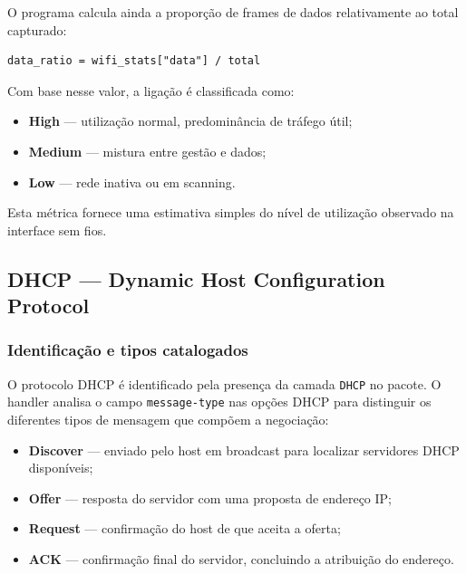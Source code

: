 \documentclass[a4paper,12pt]{article}
\begin{document}
O programa calcula ainda a proporção de frames de dados relativamente ao total capturado:

\vspace{0.5em}

\begin{lstlisting}[style=python]
data_ratio = wifi_stats["data"] / total
\end{lstlisting}

Com base nesse valor, a ligação é classificada como:

\begin{itemize}
    \item \textbf{High} — utilização normal, predominância de tráfego útil;
    \item \textbf{Medium} — mistura entre gestão e dados;
    \item \textbf{Low} — rede inativa ou em scanning.
\end{itemize}

Esta métrica fornece uma estimativa simples do nível de utilização observado na interface sem fios.



\subsection{DHCP — Dynamic Host Configuration Protocol}

\subsubsection{Identificação e tipos catalogados}

O protocolo DHCP é identificado pela presença da camada \texttt{DHCP} no pacote. O handler
analisa o campo \texttt{message-type} nas opções DHCP para distinguir os diferentes tipos
de mensagem que compõem a negociação:

\begin{itemize}
    \item \textbf{Discover} — enviado pelo host em broadcast para localizar servidores DHCP disponíveis;
    \item \textbf{Offer} — resposta do servidor com uma proposta de endereço IP;
    \item \textbf{Request} — confirmação do host de que aceita a oferta;
    \item \textbf{ACK} — confirmação final do servidor, concluindo a atribuição do endereço.
\end{itemize}
\end{document}
